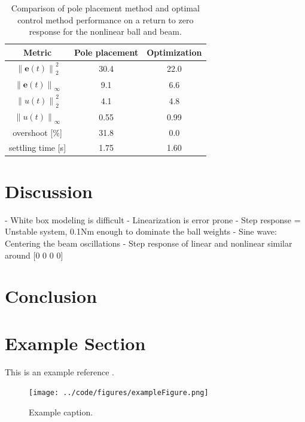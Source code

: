 \documentclass[a4paper, titlepage]{article}
\begin{document}
\begin{table}[h!]
\centering
 \begin{tabular}{||c c c||} 
 \hline
 Metric & Pole placement & Optimization \\ [0.5ex] 
 \hline\hline
 $\left\lVert \textbf{e}(t)\right\rVert_2^2$ & 30.4 & 22.0 \\ 
 $\left\lVert \textbf{e}(t)\right\rVert_\infty$ & 9.1 & 6.6 \\
 $\left\lVert u(t)\right\rVert_2^2$ & 4.1 & 4.8 \\
 $\left\lVert u(t)\right\rVert_\infty$ & 0.55 & 0.99 \\
 overshoot [\%] & 31.8 & 0.0 \\
 settling time [s] & 1.75 & 1.60 \\ [1ex] 
 \hline
 \end{tabular}
 \caption{Comparison of pole placement method and optimal control method performance on a return to zero response for the nonlinear ball and beam.}
 \label{tab:compare}
\end{table}


\section{Discussion}
- White box modeling is difficult
- Linearization is error prone
- Step response = Unstable system, 0.1Nm enough to dominate the ball weights
- Sine wave: Centering the beam oscillations
- Step response of linear and nonlinear similar around [0 0 0 0]

\section{Conclusion}

\clearpage


\clearpage
\appendix

\section{Example Section}
This is an example reference \citep{glad00}.

\begin{figure}[h!]
\center
\texttt{[image: ../code/figures/exampleFigure.png]}
\caption{Example caption.}
\label{fig:exampleLable}
\end{figure}


\end{document}
